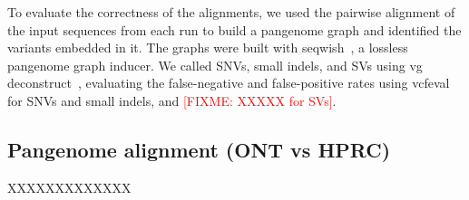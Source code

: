 \documentclass{bioinfo}
\theoremstyle{definition}
\newcommand{\red}[1]{{\textcolor{Red}{#1}}}
\newcommand{\FIXME}[1]{\red{[FIXME: #1]}}
\begin{document}
To evaluate the correctness of the alignments, we used the pairwise alignment of the input sequences from each run to build a pangenome graph and identified the variants embedded in it.
The graphs were built with seqwish~\citep{Garrison2022}, a lossless pangenome graph inducer.
We called SNVs, small indels, and SVs using vg deconstruct~\citep{Garrison:2018}, evaluating the false-negative and false-positive rates using vcfeval~\citep{Cleary2015} for SNVs and small indels, and \FIXME{XXXXX for SVs}.


\subsection{Pangenome alignment (ONT vs HPRC)}
XXXXXXXXXXXXX


\begin{comment}

\begin{table}[!t]
    \processtable{
        \small
        Performance of pairwise alignment of long sequences from the \textit{Saccharomyces cerevisiae}
        chromosome IV.
        \label{Tab:01}} {
        \begin{tabular}{@{}llllllll@{}}
            \toprule Aligner & Divergence & Length & Runtime (mm:ss) & Memory (GB) & Precision & Sensitivity & F-measure \\
            \midrule
            row1             & row1       & row1   & row1            & row1        & row1      & row1        & row1      \\
            row2             & row2       & row2   & row2            & row1        & row1      & row1        & row1      \\
            row3             & row3       & row3   & row3            & row1        & row1      & row1        & row1      \\
            row4             & row4       & row4   & row4            & row1        & row1      & row1        & row1      \\
            \botrule
        \end{tabular}
    }
\end{table}


\subsection{Real data}
\\


\end{comment}
\end{document}
